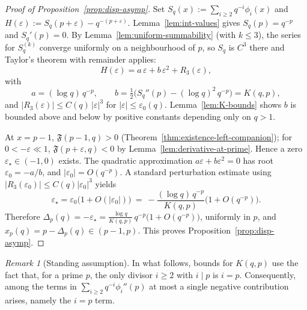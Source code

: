\documentclass[11pt,a4paper]{amsart}
\theoremstyle{plain}
\theoremstyle{definition}
\theoremstyle{remark}
\newtheorem{remark}[theorem]{Remark}
\begin{document}
\begin{proof}[Proof of Proposition~\ref{prop:disp-asymp}]
Set $S_q(x):=\sum_{i\ge2}q^{-i}\phi_i(x)$ and $H(\varepsilon):=S_q(p+\varepsilon)-q^{-(p+\varepsilon)}$. Lemma~\ref{lem:int-values} gives $S_q(p)=q^{-p}$ and $S_q'(p)=0$. By Lemma~\ref{lem:uniform-summability} (with $k\le 3$), the series for $S_q^{(k)}$ converge uniformly on a neighbourhood of $p$, so $S_q$ is $C^3$ there and Taylor’s theorem with remainder applies:
\[
H(\varepsilon)=a\,\varepsilon+b\,\varepsilon^2+R_3(\varepsilon),
\]
with
\[
a=(\log q)\,q^{-p},\qquad b=\tfrac12\Big(S_q''(p)-(\log q)^2\,q^{-p}\Big)=K(q,p),
\]
and $|R_3(\varepsilon)|\le C(q)\,|\varepsilon|^3$ for $|\varepsilon|\le\varepsilon_0(q)$. Lemma~\ref{lem:K-bounds} shows $b$ is bounded above and below by positive constants depending only on $q>1$.

At $x=p-1$, $\mathfrak F(p-1,q)>0$ (Theorem~\ref{thm:existence-left-companion}); for $0<-\varepsilon\ll1$, $\mathfrak F(p+\varepsilon,q)<0$ by Lemma~\ref{lem:derivative-at-prime}. Hence a zero $\varepsilon_\star\in(-1,0)$ exists. The quadratic approximation $a\varepsilon+b\varepsilon^2=0$ has root $\varepsilon_0=-a/b$, and $|\varepsilon_0|=O(q^{-p})$. A standard perturbation estimate using $|R_3(\varepsilon_0)|\le C(q)|\varepsilon_0|^3$ yields
\[
\varepsilon_\star=\varepsilon_0\Big(1+O(|\varepsilon_0|)\Big)\ =\ -\frac{(\log q)\,q^{-p}}{K(q,p)}\Big(1+O(q^{-p})\Big).
\]
Therefore $\Delta_p(q)=-\varepsilon_\star=\frac{\log q}{K(q,p)}\,q^{-p}\big(1+O(q^{-p})\big)$, uniformly in $p$, and $x_p(q)=p-\Delta_p(q)\in(p-1,p)$.
This proves Proposition~\ref{prop:disp-asymp}.
\end{proof}


\begin{remark}[Standing assumption]\label{rem:standing-K}
In what follows, bounds for $K(q,p)$ use the fact that, for a prime $p$, the only divisor $i\ge 2$ with $i\mid p$ is $i=p$. Consequently, among the terms in $\sum_{i\ge 2} q^{-i}\phi_i''(p)$ at most a single negative contribution arises, namely the $i=p$ term.
\end{remark}
\end{document}
